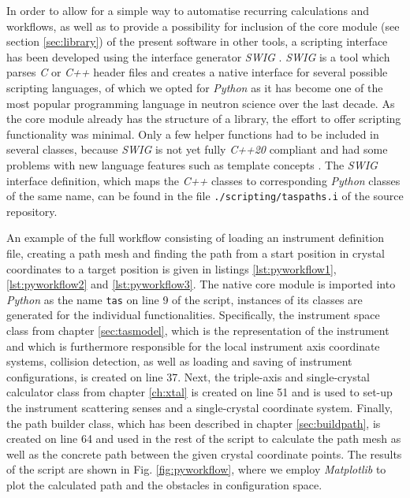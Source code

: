 In order to allow for a simple way to automatise recurring calculations and workflows, as well as to provide
a possibility for inclusion of the core module (see section \ref{sec:library}) of the present 
software in other tools, a scripting interface has been developed using the interface generator \textit{SWIG} \cite{web_swig}. 
\textit{SWIG} is a tool which parses \textit{C} or \textit{C++} header files and creates a native interface 
for several possible scripting languages, of which we opted for \textit{Python} \cite{Rossum2011, web_python} 
as it has become one of the most popular programming language in neutron science over the last decade.
As the core module already has the structure of a library, the effort to offer scripting functionality
was minimal. Only a few helper functions had to be included in several classes, because \textit{SWIG}
is not yet fully \textit{C++20} compliant and had some problems with new language features such as 
template concepts \cite{TODO}.
The \textit{SWIG} interface definition, which maps the \textit{C++} classes to corresponding \textit{Python} 
classes of the same name, can be found in the file \lstinline|./scripting/taspaths.i| of the source repository.

An example of the full workflow consisting of loading an instrument definition file, creating a path 
mesh and finding the path from a start position in crystal coordinates to a target position is given in listings 
\ref{lst:pyworkflow1}, \ref{lst:pyworkflow2} and \ref{lst:pyworkflow3}.
The native core module is imported into \textit{Python} as the name \lstinline[language=C++]|tas| on line 9 of the script,
instances of its classes are generated for the individual functionalities.
Specifically, the instrument space class from chapter \ref{sec:tasmodel}, which is the representation of the instrument 
and which is furthermore responsible for the local instrument axis coordinate systems, collision detection, as well as 
loading and saving of instrument configurations, is created on line 37. 
Next, the triple-axis and single-crystal calculator class from chapter \ref{ch:xtal} is created on line 51 and is 
used to set-up the instrument scattering senses and a single-crystal coordinate system.
Finally, the path builder class, which has been described in chapter \ref{sec:buildpath}, is created on line 64 
and used in the rest of the script to calculate the path mesh as well as the concrete path between the 
given crystal coordinate points.
The results of the script are shown in Fig. \ref{fig:pyworkflow}, where we employ \textit{Matplotlib} \cite{web_matplotlib} 
to plot the calculated path and the obstacles in configuration space.

